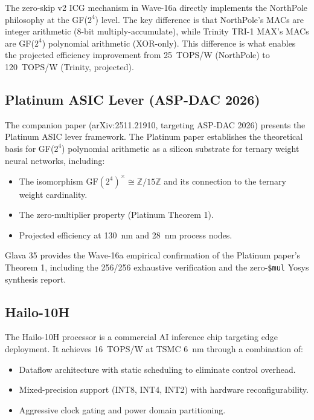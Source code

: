 The zero-skip v2 ICG mechanism in Wave-16a directly implements the
NorthPole philosophy at the GF(\(2^4\)) level.
The key difference is that NorthPole's MACs are integer arithmetic
(8-bit multiply-accumulate), while Trinity TRI-1 MAX's MACs are
GF(\(2^4\)) polynomial arithmetic (XOR-only).
This difference is what enables the projected efficiency improvement from
25~TOPS/W (NorthPole) to 120~TOPS/W (Trinity, projected).

\subsection{Platinum ASIC Lever (ASP-DAC 2026)}

The companion paper \cite{platinum_aspdac2026} (arXiv:2511.21910, targeting
ASP-DAC 2026) presents the Platinum ASIC lever framework.
The Platinum paper establishes the theoretical basis for GF(\(2^4\))
polynomial arithmetic as a silicon substrate for ternary weight neural networks,
including:
\begin{itemize}
  \item The isomorphism \(\mathrm{GF}(2^4)^\times \cong \mathbb{Z}/15\mathbb{Z}\)
        and its connection to the ternary weight cardinality.
  \item The zero-multiplier property (Platinum Theorem 1).
  \item Projected efficiency at 130~nm and 28~nm process nodes.
\end{itemize}

Glava 35 provides the Wave-16a empirical confirmation of the Platinum
paper's Theorem 1, including the 256/256 exhaustive verification and
the zero-\texttt{\$mul} Yosys synthesis report.

\subsection{Hailo-10H}

The Hailo-10H processor \cite{hailo10h_datasheet} is a commercial AI
inference chip targeting edge deployment.
It achieves 16~TOPS/W at TSMC 6~nm through a combination of:
\begin{itemize}
  \item Dataflow architecture with static scheduling to eliminate control overhead.
  \item Mixed-precision support (INT8, INT4, INT2) with hardware reconfigurability.
  \item Aggressive clock gating and power domain partitioning.
\end{itemize}

